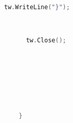 \begin{theappendices}
\begin{lstlisting}[language=c++, caption= Code in GH to write OF text file in 0/Brick/T]
      tw.WriteLine("}");



      tw.Close();








    }

\end{lstlisting}




\end{theappendices}